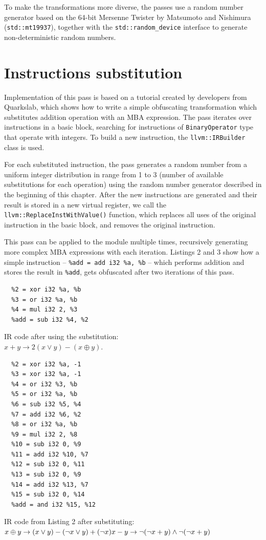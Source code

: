 \documentclass[
  digital, %
  notable,   %
  twoside, %
  nolof,     %
  nolot,     %
]{fithesis3}
\theoremstyle{definition}
\begin{document}
To make the transformations more diverse, the passes use a random number generator based on the 64-bit Mersenne Twister by Matsumoto and Nishimura (\texttt{std::mt19937}), together with the \texttt{std::random\_device} interface to generate non-deterministic random numbers.

\section{Instructions substitution}
Implementation of this pass is based on a tutorial \cite{Guelton2015} created by developers from Quarkslab, which shows how to write a simple obfuscating transformation which substitutes addition operation with an MBA expression. 
The pass iterates over instructions in a basic block, searching for instructions of \texttt{BinaryOperator} type that operate with integers. To build a new instruction, the \texttt{llvm::IRBuilder} class is used. 

For each substituted instruction, the pass generates a random number from a uniform integer distribution in range from 1 to 3 (number of available substitutions for each operation) using the random number generator described in the beginning of this chapter. After the new instructions are generated and their result is stored in a new virtual register, we call the \texttt{llvm::ReplaceInstWithValue()} function, which replaces all uses of the original instruction in the basic block, and removes the original instruction. 

This pass can be applied to the module multiple times, recursively generating more complex MBA expressions with each iteration. Listings 2 and 3 show how a simple instruction -- \texttt{\%add = add i32 \%a, \%b} -- which performs addition and stores the result in \texttt{\%add}, gets obfuscated after two iterations of this pass.

\begin{listing}
\begin{verbatim}
  %2 = xor i32 %a, %b
  %3 = or i32 %a, %b
  %4 = mul i32 2, %3
  %add = sub i32 %4, %2  
\end{verbatim}
\label{lst:sub1}
\caption{IR code after using the substitution:\\ $x+y \rightarrow 2(x \vee y) - (x \oplus y)$.}
\end{listing}

\begin{listing}
\begin{verbatim}
  %2 = xor i32 %a, -1
  %3 = xor i32 %a, -1
  %4 = or i32 %3, %b
  %5 = or i32 %a, %b
  %6 = sub i32 %5, %4
  %7 = add i32 %6, %2
  %8 = or i32 %a, %b
  %9 = mul i32 2, %8
  %10 = sub i32 0, %9
  %11 = add i32 %10, %7
  %12 = sub i32 0, %11
  %13 = sub i32 0, %9
  %14 = add i32 %13, %7
  %15 = sub i32 0, %14
  %add = and i32 %15, %12 
\end{verbatim}
\label{lst:sub2}
\caption{IR code from Listing 2 after substituting:\\
$x\oplus y \rightarrow(x \vee y)-(\neg x \vee y)+(\neg x)\\
x - y \rightarrow \neg ( \neg x + y) \wedge \neg(\neg x + y)$}
\end{listing}
\end{document}
